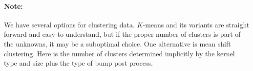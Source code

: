 \paragraph{Note:}
We have several options for clustering data. $K$-means and its variants are straight forward and easy to understand, but if the proper number of clusters is part of the unknowns, it may be a suboptimal choice.
One alternative is mean shift clustering. Here is the number of clusters determined implicitly by the kernel type and size plus the type of bump post process.
